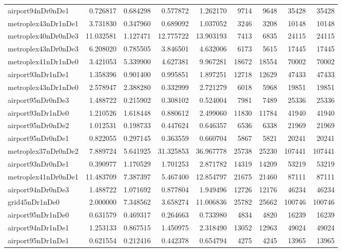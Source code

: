\begin{longtable}{|l|r|r|r|r|r|r|r|r|}
airport94nDr0nDe1 & 0.726817 & 0.684298 & 0.577872 & 1.262170 & 9714 & 9648 & 35428 & 35428 \\
metroplex43nDr1nDe1 & 3.731830 & 0.347960 & 0.689092 & 1.037052 & 3246 & 3208 & 10148 & 10148 \\
metroplex40nDr0nDe3 & 11.032581 & 1.127471 & 12.775722 & 13.903193 & 7413 & 6835 & 24115 & 24115 \\
metroplex43nDr0nDe3 & 6.208020 & 0.785505 & 3.846501 & 4.632006 & 6173 & 5615 & 17445 & 17445 \\
metroplex41nDr1nDe0 & 3.421053 & 5.339900 & 4.627381 & 9.967281 & 18672 & 18554 & 70002 & 70002 \\
airport93nDr1nDe1 & 1.358396 & 0.901400 & 0.995851 & 1.897251 & 12718 & 12629 & 47433 & 47433 \\
metroplex43nDr1nDe0 & 2.578947 & 2.388280 & 0.332999 & 2.721279 & 6018 & 5968 & 19851 & 19851 \\
airport95nDr0nDe3 & 1.488722 & 0.215902 & 0.308102 & 0.524004 & 7981 & 7489 & 25336 & 25336 \\
airport93nDr1nDe0 & 1.210526 & 1.618448 & 0.880612 & 2.499060 & 11830 & 11784 & 41940 & 41940 \\
airport95nDr0nDe2 & 1.012531 & 0.198733 & 0.447624 & 0.646357 & 6536 & 6338 & 21969 & 21969 \\
airport95nDr0nDe1 & 0.822055 & 0.297145 & 0.363559 & 0.660704 & 5867 & 5821 & 20241 & 20241 \\
metroplex37nDr0nDe2 & 7.889724 & 5.641925 & 31.325853 & 36.967778 & 25738 & 25230 & 107441 & 107441 \\
airport93nDr0nDe1 & 0.390977 & 1.170529 & 1.701253 & 2.871782 & 14319 & 14209 & 53219 & 53219 \\
metroplex41nDr0nDe1 & 11.483709 & 7.387397 & 5.467400 & 12.854797 & 21675 & 21460 & 87111 & 87111 \\
airport94nDr0nDe3 & 1.488722 & 1.071692 & 0.877804 & 1.949496 & 12726 & 12176 & 46234 & 46234 \\
grid45nDr1nDe0 & 2.000000 & 7.348562 & 3.658274 & 11.006836 & 25782 & 25662 & 100746 & 100746 \\
airport95nDr1nDe0 & 0.631579 & 0.469317 & 0.264663 & 0.733980 & 4834 & 4820 & 16239 & 16239 \\
airport94nDr1nDe1 & 1.253133 & 0.867515 & 1.450975 & 2.318490 & 13052 & 12963 & 49024 & 49024 \\
airport95nDr1nDe1 & 0.621554 & 0.212416 & 0.442378 & 0.654794 & 4275 & 4245 & 13965 & 13965 \\

\end{longtable}
